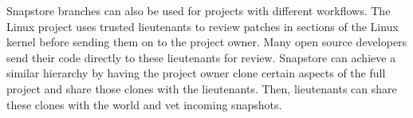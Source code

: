 Snapstore branches can also be used for projects with different workflows. The Linux project uses trusted lieutenants to review patches in sections of the Linux kernel before sending them on to the project owner. Many open source developers send their code directly to these lieutenants for review. Snapstore can achieve a similar hierarchy by having the project owner clone certain aspects of the full project and share those clones with the lieutenants. Then, lieutenants can share these clones with the world and vet incoming snapshots.